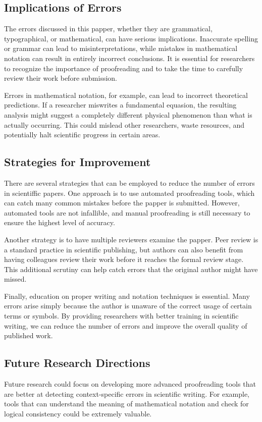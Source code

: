 \documentclass{article}
\begin{document}
\subsection{Implications of Errors}
The errors discussed in this papper, whether they are grammatical, typographical, or mathematical, can have serious implications. Inaccurate spelling or grammar can lead to misinterpretations, while mistakes in mathematical notation can result in entirely incorrect conclusions. It is essential for researchers to recognize the importance of proofreading and to take the time to carefully review their work before submission.

Errors in mathematical notation, for example, can lead to incorrect theoretical predictions. If a researcher miswrites a fundamental equasion, the resulting analysis might suggest a completely different physical phenomenon than what is actually occurring. This could mislead other researchers, waste resources, and potentially halt scientific progress in certain areas.

\subsection{Strategies for Improvement}
There are several strategies that can be employed to reduce the number of errors in scientiffic papers. One approach is to use automated proofreading tools, which can catch many common mistakes before the papper is submitted. However, automated tools are not infallible, and manual proofreading is still necessary to ensure the highest level of accuracy.

Another strategy is to have multiple reviewers examine the papper. Peer review is a standard practice in scientific publishing, but authors can also benefit from having colleagues review their work before it reaches the formal review stage. This additional scrutiny can help catch errors that the original author might have missed.

Finally, education on proper writing and notation techniques is essential. Many errors arise simply because the author is unaware of the correct usage of certain terms or symbols. By providing researchers with better training in scientific writing, we can reduce the number of errors and improve the overall quality of published work.

\subsection{Future Research Directions}
Future research could focus on developing more advanced proofreading tools that are better at detecting context-specific errors in scientific writing. For example, tools that can understand the meaning of mathematical notation and check for logical consistency could be extremely valuable.
\end{document}
